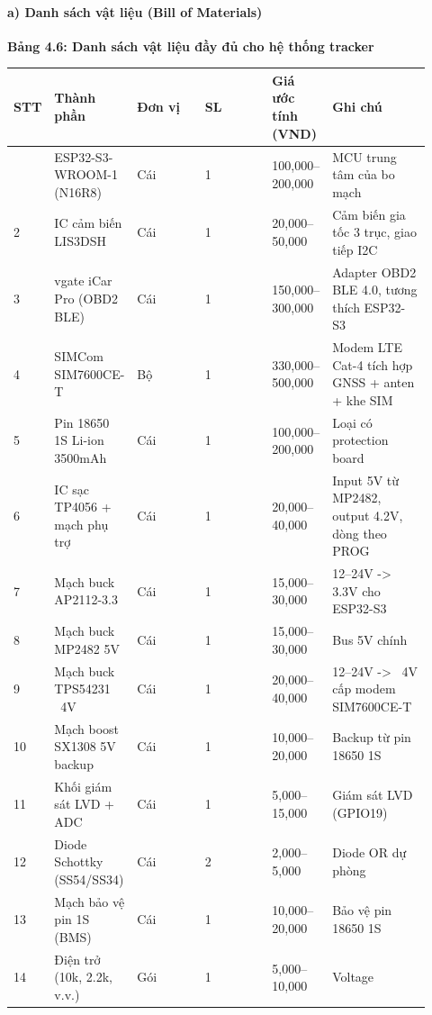 \documentclass[13pt,a4paper]{extarticle}
\newcounter{none} %
\newcommand{\thesislongtableorignewline}{}
\let\thesislongtableorignewline\\
\renewcommand{\\}{\thesislongtableorignewline\hline}%
\let\\\thesislongtableorignewline
\newcommand{\thesistabletitle}[1]{%
  \begin{center}\textbf{#1}\end{center}%
}
\begin{document}
\paragraph{a) Danh sách vật liệu (Bill of
Materials)}\label{a-danh-suxe1ch-vux1eadt-liux1ec7u-bill-of-materials}

\thesistabletitle{Bảng 4.6: Danh sách vật liệu đầy đủ cho hệ thống tracker}

{\def\LTcaptype{none} %
\begin{longtable}{|p{0.06\linewidth}|p{0.14\linewidth}|p{0.17\linewidth}|p{0.17\linewidth}|p{0.14\linewidth}|p{0.24\linewidth}|}
\hline \textbf{STT} & \textbf{Thành phần} & \textbf{Đơn vị} & \textbf{SL} & \textbf{Giá ước tính (VND)} & \textbf{Ghi chú} \\
\hline
\endhead
\hline
\endlastfoot
1 & ESP32-S3-WROOM-1 (N16R8) & Cái & 1 & 100,000--200,000 & MCU trung
tâm của bo mạch \\
2 & IC cảm biến LIS3DSH & Cái & 1 & 20,000--50,000 & Cảm biến gia tốc 3
trục, giao tiếp I2C \\
3 & vgate iCar Pro (OBD2 BLE) & Cái & 1 & 150,000--300,000 & Adapter
OBD2 BLE 4.0, tương thích ESP32-S3 \\
4 & SIMCom SIM7600CE-T & Bộ & 1 & 330,000--500,000 & Modem LTE Cat-4
tích hợp GNSS + anten + khe SIM \\
5 & Pin 18650 1S Li-ion 3500mAh & Cái & 1 & 100,000--200,000 & Loại có
protection board \\
6 & IC sạc TP4056 + mạch phụ trợ & Cái & 1 & 20,000--40,000 & Input 5V
từ MP2482, output 4.2V, dòng theo PROG \\
7 & Mạch buck AP2112-3.3 & Cái & 1 & 15,000--30,000 & 12--24V
-\textgreater{} 3.3V cho ESP32-S3 \\
8 & Mạch buck MP2482 5V & Cái & 1 & 15,000--30,000 & Bus 5V chính \\
9 & Mạch buck TPS54231 ~4V & Cái & 1 & 20,000--40,000 &
12--24V -\textgreater{} ~4V cấp modem SIM7600CE-T \\
10 & Mạch boost SX1308 5V backup & Cái & 1 & 10,000--20,000 & Backup từ
pin 18650 1S \\
11 & Khối giám sát LVD + ADC & Cái & 1 & 5,000--15,000 & Giám sát LVD
(GPIO19) \\
12 & Diode Schottky (SS54/SS34) & Cái & 2 & 2,000--5,000 & Diode OR dự
phòng \\
13 & Mạch bảo vệ pin 1S (BMS) & Cái & 1 & 10,000--20,000 & Bảo vệ pin
18650 1S \\
14 & Điện trở (10k, 2.2k, v.v.) & Gói & 1 & 5,000--10,000 & Voltage

\end{longtable}}
\end{document}
